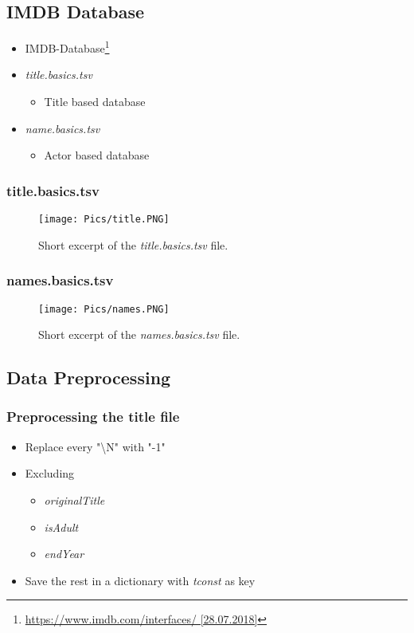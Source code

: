 \documentclass[11pt]{beamer}
\begin{document}
	\subsection{IMDB Database}
	\begin{frame}
		\begin{itemize}
			\item IMDB-Database\footnote{\url{https://www.imdb.com/interfaces/ [28.07.2018]}} \pause
			\item \textit{title.basics.tsv} \pause
			\begin{itemize}
				\item Title based database  \pause
			\end{itemize}
			\item \textit{name.basics.tsv} \pause
			\begin{itemize}
				\item Actor based database 
			\end{itemize}
		\end{itemize}
	\end{frame}

	\begin{frame}
		\frametitle{title.basics.tsv}
		\begin{figure}[ht]
			\centering
			\texttt{[image: Pics/title.PNG]}
			\caption{Short excerpt of the \textit{title.basics.tsv} file.}
			\label{pic:title}
		\end{figure}
	\end{frame}

	\begin{frame}
		\frametitle{names.basics.tsv}
		\begin{figure}[ht]
			\centering
			\texttt{[image: Pics/names.PNG]}
			\caption{Short excerpt of the \textit{names.basics.tsv} file.}
			\label{pic:names}
		\end{figure}
	\end{frame}
	
	\subsection{Data Preprocessing}
	\begin{frame}
		\frametitle{Preprocessing the title file}
		\begin{itemize}
			\item Replace every "\textbackslash N" with "-1" \pause
			\item Excluding \pause
			\begin{itemize}
				\item \textit{originalTitle} \pause
				\item \textit{isAdult} \pause
				\item \textit{endYear} \pause
			\end{itemize}
			\item Save the rest in a dictionary with \textit{tconst} as key
		\end{itemize}
	\end{frame}
\end{document}
